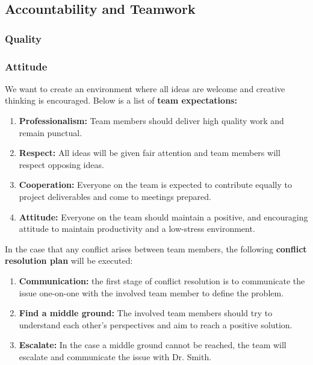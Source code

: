 \documentclass{article}
\begin{document}
\subsection*{Accountability and Teamwork}

\subsubsection*{Quality} 


\subsubsection*{Attitude}

We want to create an environment where all ideas are welcome and creative thinking is encouraged. Below is a list of \textbf{team expectations:}

\begin{enumerate}
    \item \textbf{Professionalism:} Team members should deliver high quality work and remain punctual.
    \item \textbf{Respect:} All ideas will be given fair attention and team members will respect opposing ideas.
    \item \textbf{Cooperation:} Everyone on the team is expected to contribute equally to project deliverables and come to meetings prepared.
    \item \textbf{Attitude:} Everyone on the team should maintain a positive, and encouraging attitude to maintain productivity and a low-stress environment.
\end{enumerate}

\noindent In the case that any conflict arises between team members, the following \textbf{conflict resolution plan} will be executed:

\begin{enumerate}
    \item \textbf{Communication:} the first stage of conflict resolution is to communicate the issue one-on-one with the involved team member to define the problem.
    \item \textbf{Find a middle ground:} The involved team members should try to understand each other's perspectives and aim to reach a positive solution.
    \item \textbf{Escalate:} In the case a middle ground cannot be reached, the team will escalate and communicate the issue with Dr. Smith.
\end{enumerate}
\end{document}
